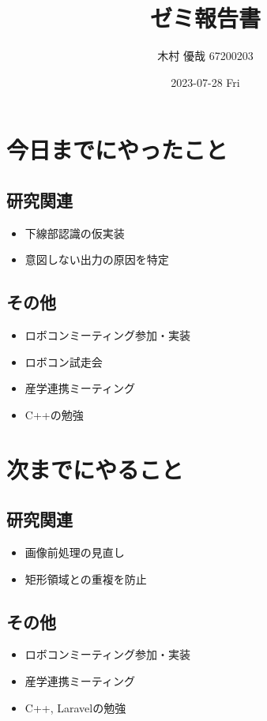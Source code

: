 \documentclass[uplatex, onecolumn, 10pt]{jsarticle}
\begin{document}
\title{\vspace{-40mm}\bf{\LARGE{ゼミ報告書}}}
\author{\vspace{-40mm}木村 優哉 67200203}
\date{2023-07-28 Fri}
\maketitle


\section{今日までにやったこと}

\subsection*{研究関連}
\begin{itemize}
	\item 下線部認識の仮実装
	\item 意図しない出力の原因を特定
\end{itemize}

\subsection*{その他}
\begin{itemize}
	\item ロボコンミーティング参加・実装
	\item ロボコン試走会
	\item 産学連携ミーティング
	\item C++の勉強
\end{itemize}


\section{次までにやること}

\subsection*{研究関連}
\begin{itemize}
	\item 画像前処理の見直し
	\item 矩形領域との重複を防止
\end{itemize}

\subsection*{その他}
\begin{itemize}
	\item ロボコンミーティング参加・実装
	\item 産学連携ミーティング
	\item C++, Laravelの勉強
\end{itemize}
\end{document}
